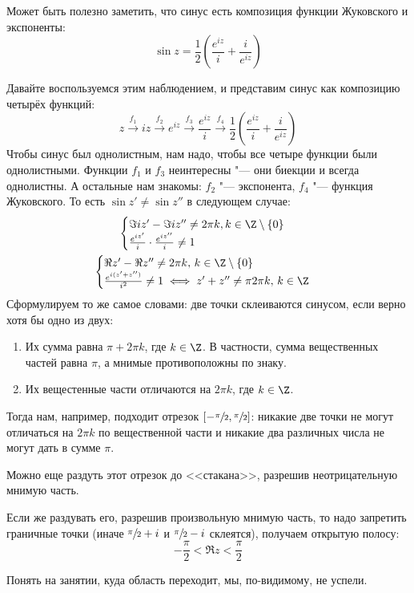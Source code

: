 	\begin{Rem}
		Может быть полезно заметить, что синус есть композиция функции Жуковского и экспоненты:
		\[ \sin z = \frac{1}{2} \left(\frac{e^{iz}}{i}+\frac{i}{e^{iz}}\right) \]
	\end{Rem}

	Давайте воспользуемся этим наблюдением, и представим синус как композицию четырёх функций:
	\[
		z
		\xrightarrow{f_1}
		iz
		\xrightarrow{f_2}
		e^{iz}
		\xrightarrow{f_3}
		\frac{e^{iz}}{i}
		\xrightarrow{f_4}
		\frac12\left(\frac{e^{iz}}{i}+\frac{i}{e^{iz}}\right)
	\]
	Чтобы синус был однолистным, нам надо, чтобы все четыре функции были однолистными.
	Функции $f_1$ и $f_3$ неинтересны "--- они биекции и всегда однолистны.
	А остальные нам знакомы: $f_2$ "--- экспонента, $f_4$ "--- функция Жуковского.
	То есть $\sin z' \neq \sin z''$ в следующем случае:
	\begin{gather*}
		\begin{cases}
			\Im iz' - \Im iz'' \neq 2\pi k, k \in \Z \setminus \{ 0 \} \\
			\frac{e^{iz'}}{i} \cdot \frac{e^{iz''}}{i} \neq 1
		\end{cases} \\
		\begin{cases}
			\Re z' - \Re z'' \neq 2\pi k,\, k \in \Z \setminus \{ 0 \} \\
			\frac{e^{i(z'+z'')}}{i^2} \neq 1 \iff
			z'+z'' \neq \pi 2\pi k,\, k \in \Z
		\end{cases}
	\end{gather*}
	Сформулируем то же самое словами: две точки склеиваются синусом, если верно хотя бы одно из двух:
	\begin{enumerate}
		\item
			Их сумма равна $\pi + 2\pi k$, где $k \in \Z$.
			В частности, сумма вещественных частей равна $\pi$, а мнимые противоположны по знаку.
		\item
			Их вещестенные части отличаются на $2\pi k$, где $k \in \Z$.
	\end{enumerate}
	Тогда нам, например, подходит отрезок $[-\sfrac \pi 2, \sfrac \pi 2]$:
	никакие две точки не могут отличаться на $2\pi k$ по вещественной части и никакие
	два различных числа не могут дать в сумме $\pi$.

	Можно еще раздуть этот отрезок до <<стакана>>, разрешив неотрицательную мнимую часть.

	Если же раздувать его, разрешив произвольную мнимую часть, то надо запретить граничные
	точки (иначе $\sfrac{\pi}2+i$ и $\sfrac{\pi}2-i$ склеятся), получаем открытую полосу:
	\[ -\frac \pi 2 < \Re z < \frac \pi 2 \]

	Понять на занятии, куда область переходит, мы, по-видимому, не успели. \TODO
